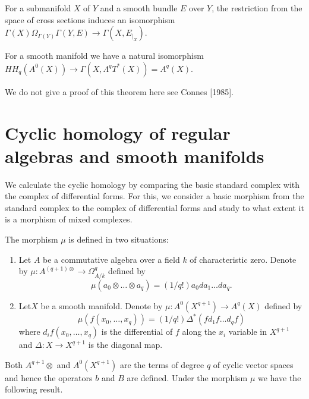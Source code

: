 \begin{remark}\label{chap6-rem4.4}
For a submanifold $X$ of $Y$ and a smooth bundle $E$ over $Y$, the
restriction from the space of cross sections induces an isomorphism
$\Gamma(X)\Omega_{\Gamma(Y)}\Gamma(Y,E)\to \Gamma(X,E_{|_{X}})$.
\end{remark}

\begin{theorem}\label{chap6-thm4.5}
For a smooth manifold we have a natural isomorphism
$HH_{q}(A^{0}(X))\to \Gamma(X,\Lambda^{q}T^{\ast}(X))=A^{q}(X)$. 

We do not give a proof of this theorem here see Connes [1985].
\end{theorem}

\section[Cyclic homology of regular algebras and...]{Cyclic homology
  of regular algebras and smooth 
  manifolds}\label{chap6-sec5} 

We calculate the cyclic homology by comparing the basic standard
complex with the complex of differential forms. For this, we consider
a basic morphism from the standard complex to the complex of
differential forms and study to what extent it is a morphism of mixed
complexes. 

\begin{notation}\label{chap6-not5.1}
The morphism $\mu$ is defined in two situations:
\begin{enumerate}
\renewcommand{\labelenumi}{(\theenumi)}
\item Let $A$ be a commutative algebra over a field $k$ of
  characteristic zero. Denote by $\mu:A^{(q+1)\otimes}\to
  \Omega^{q}_{A/k}$ defined by
$$
\mu(a_{0}\otimes\ldots\otimes a_{q})=(1/q!)a_{0}da_{1}\ldots da_{q}. 
$$

\item Let\pageoriginale $X$ be a smooth manifold. Denote by
  $\mu:A^{0}(X^{q+1})\to A^{q}(X)$ defined by
$$
\mu(f(x_{0},\ldots,x_{q}))=(1/q!)\Delta^{*}(fd_{1}f\ldots d_{q}f)
$$
where $d_{i}f(x_{0},\ldots,x_{q})$ is the differential of $f$ along
the $x_{i}$ variable in $X^{q+1}$ and $\Delta:X\to X^{q+1}$ is the
diagonal map.
\end{enumerate}
\end{notation}

\begin{remark}\label{chap6-rem5.2}
Both $A^{q+1}\otimes$ and $A^{0}(X^{q+1})$ are the terms of degree $q$
of cyclic vector spaces and hence the operators $b$ and $B$ are
defined. Under the morphism $\mu$ we have the following result.
\end{remark}

